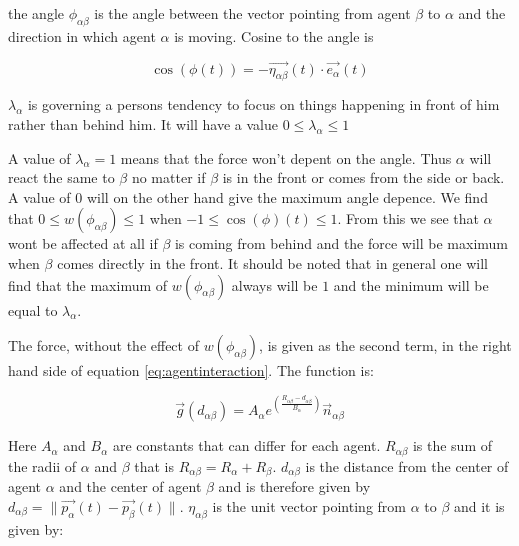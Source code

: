 the angle $\phi_{\alpha \beta}$ is the angle between the 
vector pointing from agent $\beta$ to $\alpha$ and the direction in which 
agent $\alpha$ is moving. Cosine to the angle is 

\begin{equation}
\cos \left( \phi \left( t \right) \right)
		= 
	- \overrightarrow{\eta_{\alpha \beta}}
		\left( t \right) 
	\cdot 
\overrightarrow{e_{\alpha}}\left( t \right)
\end{equation}

$\lambda_{\alpha}$ is governing a persons tendency to focus on things happening in front of him 
rather than behind him. It will have a value  $0\leq \lambda_{\alpha}\leq 1$

A value of $\lambda_{\alpha}=1$ means that the force won't depent on the angle. Thus $\alpha$ will react the same to $\beta$ no matter if $\beta$ is in the front or comes from the side or back. A value of $0$ will on the other hand give the maximum angle depence. We find that $0\leq w\left(\phi_{\alpha \beta}\right)\leq1$ when $-1 \leq \cos \left( \phi \right) \left( t \right) \leq 1$. From this we see that $\alpha$ wont be affected at all if $\beta$ is coming from behind and the force will be maximum when $\beta$ comes directly in the front. It should be noted that in general one will find that the maximum of $w\left(\phi_{\alpha \beta}\right)$ always will be $1$ and the minimum will be equal to $\lambda_{\alpha}$.   


The force, without the effect of $w\left(\phi_{\alpha \beta}\right)$, is given as the second term, in the right hand side of equation \ref{eq:agentinteraction}. The function is:  

\begin{equation}
	\overrightarrow{g} 
	\left(
	d_{\alpha \beta}
	\right)
	=
	 A_{\alpha} e^{ \left(\frac{ R_{\alpha \beta} - d_{\alpha \beta}}{B_{\alpha}}\right)}
	\overrightarrow{n}_{\alpha \beta}
	        \label{re}	
\end{equation}

Here $A_{\alpha}$ and $B_{\alpha}$ are constants that can differ for each agent. 
$R_{\alpha \beta}$ is the sum of the radii of $\alpha$ and $\beta$ that is 
$R_{\alpha \beta} = R_{\alpha} + R_{\beta}$. $d_{\alpha \beta}$ is the 
distance from the center of agent $\alpha$ and the center of 
agent $\beta$ and is therefore given by $d_{\alpha \beta} = 
\|\overrightarrow{p_{\alpha}}\left( t \right) - \overrightarrow{p_{\beta}}\left( t \right) \|$.
$\eta_{\alpha \beta}$ is the unit vector pointing from $\alpha$ to $\beta$ 
and it is given by:

